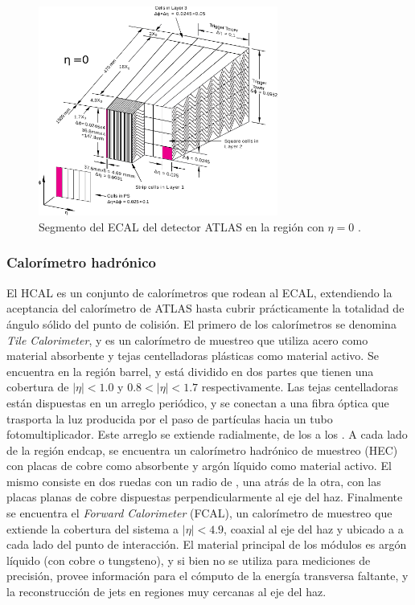 \begin{figure}
\centering
  \includegraphics[width=0.7\textwidth]{images/lhc/ecal.pdf}
  \caption{Segmento del ECAL del detector ATLAS en la región con $\eta=0$ \cite{PERF-2017-01}.}
  \label{fig:ecal}
\end{figure}

\subsubsection{Calorímetro hadrónico}

El HCAL es un conjunto de calorímetros que rodean al ECAL, extendiendo la aceptancia del calorímetro de ATLAS hasta cubrir prácticamente la totalidad de ángulo sólido del punto de colisión. El primero de los calorímetros se denomina \textit{Tile Calorimeter}, y es un calorímetro de muestreo que utiliza acero como material absorbente y tejas centelladoras plásticas como material activo. Se encuentra en la región barrel, y está dividido en dos partes que tienen una cobertura de $|\eta|<1.0$ y $0.8<|\eta|<1.7$ respectivamente. Las tejas centelladoras están dispuestas en un arreglo
periódico, y se conectan a una fibra óptica que trasporta la luz producida por el paso
de partículas hacia un tubo fotomultiplicador. Este arreglo se extiende radialmente, de los
 a los . 
A cada lado de la región endcap, se encuentra un calorímetro hadrónico de muestreo (HEC) con placas de cobre como absorbente y argón líquido como material activo. El mismo consiste en dos ruedas con un radio de , una atrás de la otra, con las placas planas de cobre dispuestas perpendicularmente al eje del haz. Finalmente se encuentra el \textit{Forward Calorimeter} (FCAL), un calorímetro de muestreo que extiende la cobertura del sistema a $|\eta|<4.9$, coaxial
al eje del haz y ubicado a  a cada lado del punto de interacción. El material
principal de los módulos es argón líquido (con cobre o tungsteno), y si bien no se
utiliza para mediciones de precisión, provee información para el cómputo de la energía transversa faltante, y la reconstrucción de jets en regiones muy cercanas al eje
del haz.




